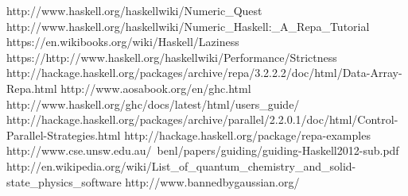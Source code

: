 \documentclass{tmr}
\begin{document}
\begin{thebibliography}{12}

  http://www.haskell.org/haskellwiki/Numeric\_Quest
 http://www.haskell.org/haskellwiki/Numeric\_Haskell:\_A\_Repa\_Tutorial
  https://en.wikibooks.org/wiki/Haskell/Laziness
  https://http://www.haskell.org/haskellwiki/Performance/Strictness
  http://hackage.haskell.org/packages/archive/repa/3.2.2.2/doc/html/Data-Array-Repa.html
  http://www.aosabook.org/en/ghc.html
  http://www.haskell.org/ghc/docs/latest/html/users\_guide/
  http://hackage.haskell.org/packages/archive/parallel/2.2.0.1/doc/html/Control-Parallel-Strategies.html
  http://hackage.haskell.org/package/repa-examples
  http://www.cse.unsw.edu.au/~benl/papers/guiding/guiding-Haskell2012-sub.pdf
  http://en.wikipedia.org/wiki/List\_of\_quantum\_chemistry\_and\_solid-state\_physics\_software
  http://www.bannedbygaussian.org/





\end{thebibliography}
\end{document}
